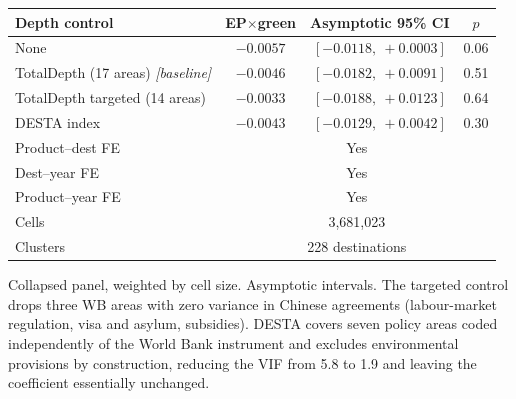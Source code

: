\small
\begin{threeparttable}
\begin{tabular}{lccc}
\toprule
Depth control & EP$\times$green & Asymptotic 95\% CI & $p$ \\
\midrule
None & $-0.0057$ & $[-0.0118,\ +0.0003]$ & 0.06 \\
TotalDepth (17 areas) \hfill\textit{[baseline]} & $-0.0046$ & $[-0.0182,\ +0.0091]$ & 0.51 \\
TotalDepth targeted (14 areas) & $-0.0033$ & $[-0.0188,\ +0.0123]$ & 0.64 \\
DESTA index & $-0.0043$ & $[-0.0129,\ +0.0042]$ & 0.30 \\
\midrule
Product--dest FE & \multicolumn{3}{c}{Yes} \\
Dest--year FE & \multicolumn{3}{c}{Yes} \\
Product--year FE & \multicolumn{3}{c}{Yes} \\
Cells & \multicolumn{3}{c}{3,681,023} \\
Clusters & \multicolumn{3}{c}{228 destinations} \\
\bottomrule
\end{tabular}
\begin{tablenotes}\footnotesize
\item Collapsed panel, weighted by cell size. Asymptotic intervals. The targeted control drops three WB areas with zero variance in Chinese agreements (labour-market regulation, visa and asylum, subsidies). DESTA covers seven policy areas coded independently of the World Bank instrument and excludes environmental provisions by construction, reducing the VIF from 5.8 to 1.9 and leaving the coefficient essentially unchanged.
\end{tablenotes}
\end{threeparttable}
